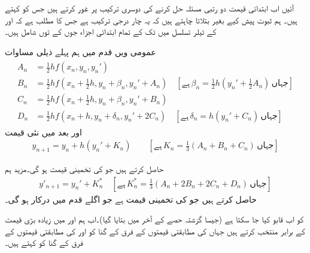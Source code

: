 آئیں اب ابتدائی قیمت دو رتبی مسئلہ حل کرنے کی دوسری ترکیب پر غور کرتے ہیں جس کو  کہتے ہیں۔ ہم ثبوت پیش کیے  بغیر بتلاتا چاہتے ہیں کہ یہ  چار درجی ترکیب ہے جس کا مطلب ہے کہ  اور  کے ٹیلر تسلسل میں   تک کے تمام ابتدائی  اجزاء جوں کے توں شامل ہیں۔  

عمومی  ویں قدم میں ہم پہلے ذیلی مساوات
\begin{gather}
\begin{aligned}\label{مساوات_اعدادی_رنج_کوٹا_نیستروم_الف}
A_n&=\tfrac{1}{2}h f(x_n,y_n,y_n')\\
B_n&=\tfrac{1}{2}hf(x_n+\tfrac{1}{2}h,y_n+\beta_n,y_n'+A_n)\quad [\text{ہے}\, \beta_n=\tfrac{1}{2}h(y_n'+\tfrac{1}{2}A_n)\,\text{جہاں}]\\
C_n&=\tfrac{1}{2}h f(x_n+\tfrac{1}{2}h,y_n+\beta_n,y_n'+B_n)\\
D_n&=\tfrac{1}{2}hf(x_n+h,y_n+\delta_n,y_n'+2C_n)\quad [\text{ہے}\, \delta_n=h(y_n'+C_n)\, \text{جہاں}]
\end{aligned}
\end{gather}
اور بعد میں نئی قیمت
\begin{align}\label{مساوات_اعدادی_رنج_کوٹا_نیستروم_ب}
y_{n+1}=y_n+h(y_n'+K_n)\quad \quad [\text{ہے}\, K_n=\tfrac{1}{3}(A_n+B_n+C_n)\,\text{جہاں}]
\end{align}

حاصل کرتے ہیں جو  کی تخمینی قیمت ہو گی۔مزید ہم
\begin{align}\label{مساوات_اعدادی_رنج_کوٹا_نیستروم_پ}
y'_{n+1}=y_n'+K_n^*\quad [\text{ہے}\, K_n^*=\tfrac{1}{3}(A_n+2B_n+2C_n+D_n)\,\text{جہاں}]
\end{align}
حاصل کرتے ہیں جو  کی تخمینی قیمت ہے جو اگلے قدم میں درکار ہو گی۔

 کو اب قابو کیا جا سکتا ہے (جیسا گزشتہ حصے کے آخر میں بتایا گیا)۔اب ہم  اور  میں زیادہ بڑی قیمت کے برابر منتخب کرتے ہیں جہاں  کی مطابقتی قیمتوں کے فرق کے  گنا کو  اور  کی مطابقتی قیمتوں کے فرق  کے  گنا کو  کہتے ہیں۔

